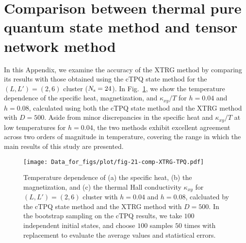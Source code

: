 \documentclass[twocolumn,superscriptaddress,showpacs, longbibliography, aps, prx]{revtex4-2}
\begin{document}
\section{Comparison between thermal pure quantum state method and tensor network method}
\label{app:XTRGcTPQ}
In this Appendix, we examine the accuracy of the XTRG method by comparing its results with those obtained using the cTPQ state method for the $(L, L') = (2, 6)$ cluster ($N_{\rm s}=24$). 
In Fig.~\ref{comp_XTRG}, we show the temperature dependence of the specific heat, magnetization, and $\kappa_{xy}/T$ for $h=0.04$ and $h=0.08$, calculated using both the cTPQ state method and the XTRG method with $D=500$. 
Aside from minor discrepancies in the specific heat and $\kappa_{xy}/T$ at low temperatures for $h=0.04$, the two methods exhibit excellent agreement across two orders of magnitude in temperature, covering the range in which the main results of this study are presented. 

\begin{figure}[tbh] 
\begin{center} 
\texttt{[image: Data\_for\_figs/plot/fig-21-comp-XTRG-TPQ.pdf]}
\vspace{-0.5cm} 
\caption{Temperature dependence of (a) the specific heat, (b) the magnetization, and
(c) the thermal Hall conductivity $\kappa_{xy}$ for $(L, L') = (2, 6)$ cluster with $h=0.04$ and $h=0.08$, calcluated by the cTPQ state method and the XTRG method with $D=500$.
In the bootstrap sampling on the cTPQ results, we take $100$ independent initial states,
and choose $100$ samples $50$ times with replacement to evaluate
the average values and statistical errors. 
}
\label{comp_XTRG}
\end{center}
\end{figure}


\end{document}
